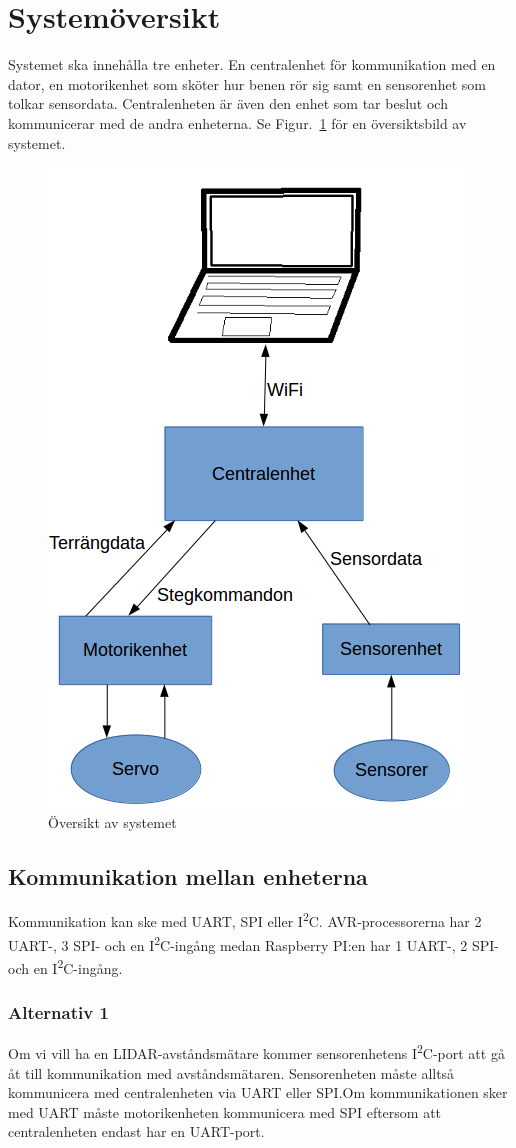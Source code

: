 \documentclass[a4paper,titlepage,12pt]{article}
\newcommand{\itc}{I\textsuperscript{2}C}
\begin{document}
	\section{Systemöversikt}
	Systemet ska innehålla tre enheter. En centralenhet för kommunikation med en
    dator, en motorikenhet som sköter hur benen rör sig samt en sensorenhet som
    tolkar sensordata. Centralenheten är även den enhet som tar beslut och
    kommunicerar med de andra enheterna. Se Figur.~\ref{fig:overview} för en översiktsbild av
    systemet.
	\begin{figure}[h]
		\centering
		\includegraphics[width=0.5\linewidth]{../images/overview.png}
		\caption{Översikt av systemet\label{fig:overview}}
	\end{figure}

	\subsection{Kommunikation mellan enheterna}
	Kommunikation kan ske med UART, SPI eller \itc{}. AVR-processorerna har
	2 UART-, 3 SPI- och en \itc{}-ingång medan Raspberry PI:en har 1 UART-, 2 SPI- och
	en \itc{}-ingång. 

	\subsubsection{Alternativ 1}
	Om vi vill ha en LIDAR-avståndsmätare kommer sensorenhetens \itc{}-port att gå åt
	till kommunikation med avståndsmätaren. Sensorenheten måste alltså kommunicera med
	centralenheten via UART eller SPI.\@ Om kommunikationen sker med UART måste 
	motorikenheten kommunicera med SPI eftersom att centralenheten endast har en
	UART-port.
\end{document}
